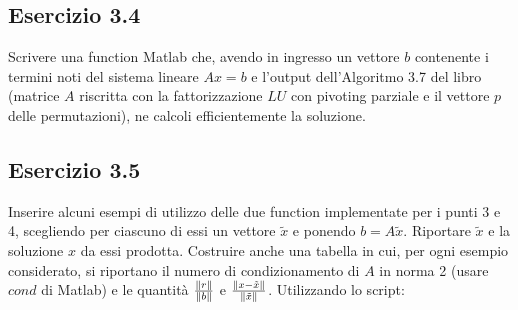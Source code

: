 	\subsection{Esercizio 3.4}

Scrivere una function Matlab che, avendo in ingresso un vettore $b$ contenente i termini noti del sistema lineare $Ax = b$ e l’output dell’Algoritmo 3.7 del libro (matrice $A$ riscritta con la fattorizzazione $LU$ con pivoting parziale e il vettore $p$ delle permutazioni), ne calcoli efficientemente la soluzione.
\PP




	\subsection{Esercizio 3.5}

 Inserire alcuni esempi di utilizzo delle due function implementate per i punti 3 e 4, scegliendo per ciascuno di essi un vettore $\tilde{x}$ e ponendo $b = A\tilde{x}$. Riportare $\tilde{x}$ e la soluzione $x$ da essi prodotta. Costruire anche una tabella in cui, per ogni esempio considerato, si riportano il numero di condizionamento di $A$ in norma 2 (usare $cond$ di Matlab) e le quantità $\frac{\norm{r}}{\norm{b}}$ e $\frac{\norm{x-\tilde{x}}}{\norm{\tilde{x}}}$.
\PP
Utilizzando lo script:




